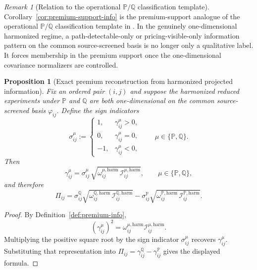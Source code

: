 \documentclass[11pt,a4paper]{amsart}
\theoremstyle{plain}
\newtheorem{proposition}[theorem]{Proposition}
\theoremstyle{definition}
\theoremstyle{remark}
\newtheorem{remark}[theorem]{Remark}
\newcommand{\PP}{\mathbb{P}}
\newcommand{\QQ}{\mathbb{Q}}
\begin{document}
\begin{remark}[Relation to the operational \(\PP/\QQ\) classification template]\label{rem:premium-support-info}
Corollary~\ref{cor:premium-support-info} is the premium-support analogue of the operational
\(\PP/\QQ\) classification template in \cite{vidal2026econometric}.  In the genuinely
one-dimensional harmonized regime, a path-detectable-only or pricing-visible-only information
pattern on the common source-screened basis is no longer only a qualitative label.  It forces
membership in the premium support once the one-dimensional covariance normalizers are controlled.
\end{remark}

\begin{proposition}[Exact premium reconstruction from harmonized projected information]\label{prop:premium-info-reconstruct}
Fix an ordered pair \((i,j)\) and suppose the harmonized reduced experiments under \(\PP\) and
\(\QQ\) are both one-dimensional on the common source-screened basis \(\varphi_{ij}\).
Define the sign indicators
\[
        \sigma_{ij}^\mu
        :=
        \begin{cases}
                1,& \gamma_{ij}^\mu>0,\\
                0,& \gamma_{ij}^\mu=0,\\
                -1,& \gamma_{ij}^\mu<0,
        \end{cases}
        \qquad
        \mu\in\{\PP,\QQ\}.
\]
Then
\[
        \gamma_{ij}^\mu
        =
        \sigma_{ij}^\mu\,
        \sqrt{
                \omega_{ij}^{\mu,\mathrm{harm}}\,
                \mathcal I_{ij}^{\mu,\mathrm{harm}}
        },
        \qquad
        \mu\in\{\PP,\QQ\},
\]
and therefore
\[
        \Pi_{ij}
        =
        \sigma_{ij}^\QQ
        \sqrt{
                \omega_{ij}^{\QQ,\mathrm{harm}}\,
                \mathcal I_{ij}^{\QQ,\mathrm{harm}}
        }
        -
        \sigma_{ij}^\PP
        \sqrt{
                \omega_{ij}^{\PP,\mathrm{harm}}\,
                \mathcal I_{ij}^{\PP,\mathrm{harm}}
        }.
\]
\end{proposition}

\begin{proof}
By Definition~\ref{def:premium-info},
\[
        (\gamma_{ij}^\mu)^2
        =
        \omega_{ij}^{\mu,\mathrm{harm}}
        \mathcal I_{ij}^{\mu,\mathrm{harm}}.
\]
Multiplying the positive square root by the sign indicator \(\sigma_{ij}^\mu\) recovers
\(\gamma_{ij}^\mu\).  Substituting that representation into
\(\Pi_{ij}=\gamma_{ij}^\QQ-\gamma_{ij}^\PP\) gives the displayed formula.
\end{proof}
\end{document}
